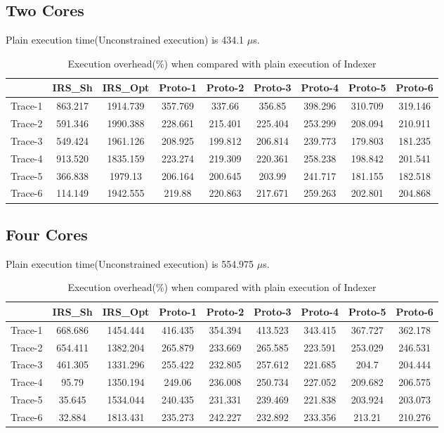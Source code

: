 \subsection{Two Cores}
Plain execution time(Unconstrained execution) is 434.1 $\mu$s.
\begin{table}[h]
\begin{center}
 \begin{tabular}{|c c c c c c c c c|} 
 \hline
 & IRS\_Sh & IRS\_Opt& Proto-1 & Proto-2 & Proto-3 & Proto-4 & Proto-5 & Proto-6\\ %
 \hline
Trace-1 & 863.217 & 1914.739 & 357.769 & 337.66 & 356.85 & 398.296 & 310.709 & 319.146\\
Trace-2 & 591.346 & 1990.388 & 228.661 & 215.401 & 225.404 & 253.299 & 208.094 & 210.911\\
Trace-3 & 549.424 & 1961.126 & 208.925 & 199.812 & 206.814 & 239.773 & 179.803 & 181.235\\
Trace-4 & 913.520 & 1835.159 & 223.274 & 219.309 & 220.361 & 258.238 & 198.842 & 201.541\\
Trace-5 & 366.838 & 1979.13 & 206.164 & 200.645 & 203.99 & 241.717 & 181.155 & 182.518\\
Trace-6 & 114.149 & 1942.555 & 219.88 & 220.863 & 217.671 & 259.263 & 202.801 & 204.868\\
\hline
\end{tabular}
\end{center}
\caption{Execution overhead(\%) when compared with plain execution of Indexer}
\label{indexer_irs_res_cores_2}
\end{table}
\subsection{Four Cores}
Plain execution time(Unconstrained execution) is 554.975 $\mu$s.
\begin{table}[h]
\begin{center}
 \begin{tabular}{|c c c c c c c c c|} 
 \hline
 & IRS\_Sh & IRS\_Opt& Proto-1 & Proto-2 & Proto-3 & Proto-4 & Proto-5 & Proto-6\\ %
 \hline
Trace-1 & 668.686 & 1454.444 & 416.435 & 354.394 & 413.523 & 343.415 & 367.727 & 362.178\\
Trace-2 & 654.411 & 1382.204 & 265.879 & 233.669 & 265.585 & 223.591 & 253.029 & 246.531\\
Trace-3 & 461.305 & 1331.296 & 255.422 & 232.805 & 257.612 & 221.685 & 204.7 & 204.444\\
Trace-4 & 95.79 & 1350.194 & 249.06 & 236.008 & 250.734 & 227.052 & 209.682 & 206.575\\
Trace-5 & 35.645 & 1534.044 & 240.435 & 231.331 & 239.469 & 221.838 & 203.924 & 203.073\\
Trace-6 & 32.884 & 1813.431 & 235.273 & 242.227 & 232.892 & 233.356 & 213.21 & 210.276\\
\hline
\end{tabular}
\end{center}
\caption{Execution overhead(\%) when compared with plain execution of Indexer}
\label{indexer_irs_res_cores_4}
\end{table}

